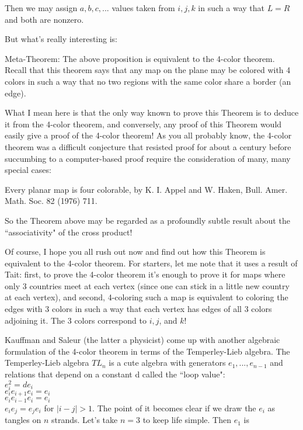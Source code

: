 Then we may assign $a,b,c,...$ values taken from ${i,j,k}$ in such a way that $L = R$ and both are nonzero.

But what's really interesting is:

Meta-Theorem: The above proposition is equivalent to the 4-color theorem. Recall that this theorem says that any map on the plane may be colored with 4 colors in such a way that no two regions with the same color share a border (an edge).

What I mean here is that the only way known to prove this Theorem is to deduce it from the 4-color theorem, and conversely, any proof of this Theorem would easily give a proof of the 4-color theorem! As you all probably know, the 4-color theorem was a difficult conjecture that resisted proof for about a century before succumbing to a computer-based proof require the consideration of many, many special cases:

Every planar map is four colorable, by K. I. Appel and W. Haken, Bull. Amer. Math. Soc. 82 (1976) 711.

So the Theorem above may be regarded as a profoundly subtle result about the ``associativity" of the cross product!

Of course, I hope you all rush out now and find out how this Theorem is equivalent to the 4-color theorem. For starters, let me note that it uses a result of Tait: first, to prove the 4-color theorem it's enough to prove it for maps where only 3 countries meet at each vertex (since one can stick in a little new country at each vertex), and second, 4-coloring such a map is equivalent to coloring the edges with 3 colors in such a way that each vertex has edges of all 3 colors adjoining it. The 3 colors correspond to $i, j$, and $k$!

Kauffman and Saleur (the latter a physicist) come up with another algebraic formulation of the 4-color theorem in terms of the Temperley-Lieb algebra. The Temperley-Lieb algebra $TL_n$ is a cute algebra with generators $e_1, ..., e_{n-1}$ and relations that depend on a constant d called the ``loop value":\\
$e_i^2 = de_i$\\
$e_i e_{i+1} e_i = e_i$\\
$e_i e_{i-1} e_i = e_i$\\
$e_i e_j = e_j e_i$     for $|i -j| > 1$.
The point of it becomes clear if we draw the $e_i$ as tangles on $n$ strands. Let's take $n=3$ to keep life simple. Then $e_1$ is\\

